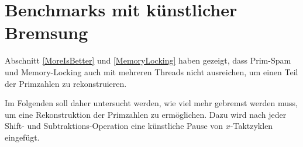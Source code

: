 



















\section{Benchmarks mit künstlicher Bremsung}
\label{Howfast}

Abschnitt \ref{MoreIsBetter} und \ref{MemoryLocking} haben gezeigt, dass Prim-Spam und Memory-Locking auch mit mehreren Threads nicht ausreichen, um einen Teil der Primzahlen zu rekonstruieren.

Im Folgenden soll daher untersucht werden, wie viel mehr gebremst werden muss, um eine Rekonstruktion der Primzahlen zu ermöglichen.
Dazu wird nach jeder Shift- und Subtraktions-Operation eine künstliche Pause von $x$-Taktzyklen eingefügt.


